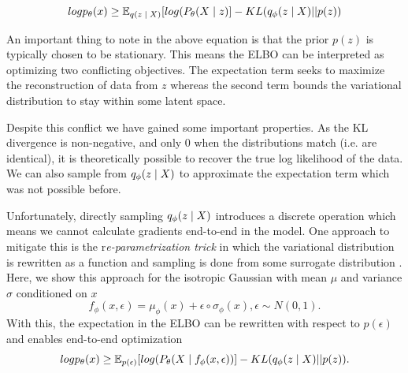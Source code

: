 \begin{equation}
	log p_{\theta}(x) \geq \operatorname{\mathbb{E}}_{q(z \; | \;{X})} [ log(P_{\theta}(X \; | \;{z}) ]  - KL(q_{\phi}(z \; | \;{X}) || p(z))
\end{equation}

An important thing to note in the above equation is that the prior $p(z)$ is typically chosen to be stationary. This means the \ac{ELBO} can be interpreted as optimizing two conflicting objectives. The expectation term seeks to maximize the reconstruction of data from $z$ whereas the second term bounds the variational distribution to stay within some latent space.

Despite this conflict we have gained some important properties. As the KL divergence is non-negative, and only 0 when the distributions match (i.e. are identical), it is theoretically possible to recover the true log likelihood of the data. We can also sample from $q_{\phi}(z \; | \;{X})$ to approximate the expectation term which was not possible before.

Unfortunately, directly sampling $q_{\phi}(z \; | \;{X})$ introduces a discrete operation which means we cannot calculate gradients end-to-end in the model. One approach to mitigate this is the r\textit{e-parametrization trick} in which the variational distribution  is rewritten as a function and sampling is done from some surrogate  distribution \cite{kingma2014autoencodingVB,rezende2014stochasticBackprop} . Here, we show this approach for the isotropic Gaussian with mean $\mu$ and variance $\sigma$ conditioned on $x$
\begin{equation}
f_{\phi}(x, \epsilon) = \mu_{\phi}(x) + \epsilon \circ \sigma_{\phi}(x), \epsilon \sim N(0, 1).
\end{equation}
With this, the expectation in the \ac{ELBO} can be rewritten with respect to $p(\epsilon)$ and enables end-to-end optimization 
\begin{equation}
log p_{\theta}(x) \geq \operatorname{\mathbb{E}}_{p(\epsilon) } [ log(P_{\theta}(X \; | \;{f_{\phi}(x, \epsilon)}) ]  - KL(q_{\phi}(z \; | \;{X}) || p(z)).
\end{equation}






